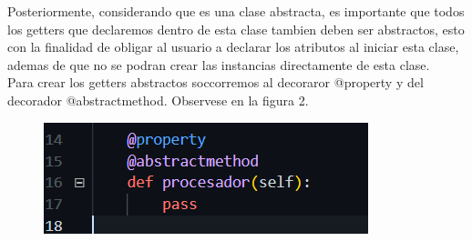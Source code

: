 \documentclass[12pt]{article}
\begin{document}
Posteriormente, considerando que es una clase abstracta, es importante que todos los getters que declaremos dentro de esta clase tambien deben ser abstractos, esto con la finalidad de obligar al usuario a declarar los atributos al iniciar esta clase, ademas de que no se podran crear las instancias directamente de esta clase. \\
Para crear los getters abstractos soccorremos al decoraror @property
y del decorador @abstractmethod. Observese en la figura 2.
\begin{figure}[H]
		\begin{center}
 			\includegraphics[width = .6\textwidth]{02.png}
 			
		\end{center} 
\end{figure}
\end{document}

